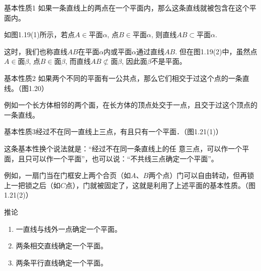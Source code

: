 \begin{blk}
  {基本性质1} 如果一条直线上的两点在一个平面内，那么这条直线就被包含在这个平面内。
\end{blk}

如图1.19(1)所示，若点$A\in$平面$\alpha$, 点$B\in$平面$\alpha$, 则直线$AB\subset$平面$\alpha$. 

这时，我们也称直线$AB$在平面$\alpha$内或平面$\alpha$通过直线$AB$. 但在图1.19(2)中，虽然点$A\in$面$\beta$, 点$B\in$面$\beta$, 而直线$AB\not\subset$面$\beta$, 因此面$\beta$不是平面。

\begin{figure}[htp]
    \centering
    
    \caption{}
\end{figure}

\begin{blk}
 {基本性质2} 如果两个不同的平面有一公共点，那么它们相交于过这个点的一条直线。（图1.20）
\end{blk}

例如一个长方体相邻的两个面，在长方体的顶点处交于一点，且交于过这个顶点的一条直线。


\begin{figure}[htp]
  \centering
  
  \caption{}
\end{figure}

\begin{blk}
  {基本性质3}经过不在同一直线上三点，有且只有一个平面．（图1.21(1)）
\end{blk}
 
这条基本性换个说法就是：“经过不在同一条直线上的任
意三点，可以作一个平面，且只可以作一个平面”，也可以说：“不共线三点确定一个平面”。

例如，一扇门当在门框安上两个合页（如$A$、$B$两个点）门可以自由转动，但再锁上一把锁之后（如$C$点），门就被固定了，这就是利用了上述平面的基本性质。（图1.21(2)）

\begin{figure}[htp]
  \centering
  
  \caption{}
\end{figure}

\begin{blk}
  {推论}
\begin{enumerate}
  \item 一直线与线外一点确定一个平面。
  \item 两条相交直线确定一个平面。
  \item 两条平行直线确定一个平面。
\end{enumerate}
\end{blk}


